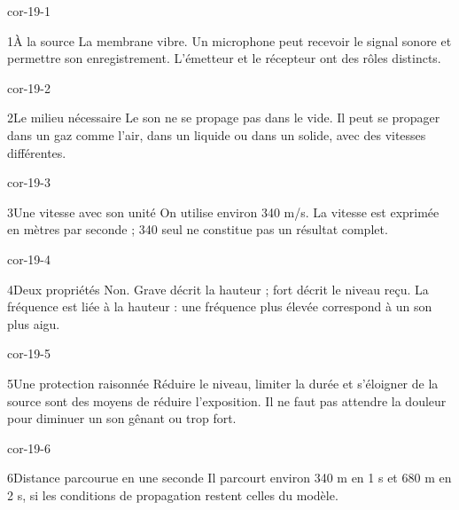 \documentclass[12pt,twoside,openany]{book}
\begin{document}
\clearpage{}
\begin{blocLivre}{cor-19-1}
\begin{corrige}{1}{À la source}
La membrane vibre. Un microphone peut recevoir le signal sonore et permettre son enregistrement. L’émetteur et le récepteur ont des rôles distincts.\par
\end{corrige}\end{blocLivre}
\begin{blocLivre}{cor-19-2}
\begin{corrige}{2}{Le milieu nécessaire}
Le son ne se propage pas dans le vide. Il peut se propager dans un gaz comme l’air, dans un liquide ou dans un solide, avec des vitesses différentes.\par
\end{corrige}\end{blocLivre}
\begin{blocLivre}{cor-19-3}
\begin{corrige}{3}{Une vitesse avec son unité}
On utilise environ 340 m/s. La vitesse est exprimée en mètres par seconde ; 340 seul ne constitue pas un résultat complet.\par
\end{corrige}\end{blocLivre}
\begin{blocLivre}{cor-19-4}
\begin{corrige}{4}{Deux propriétés}
Non. Grave décrit la hauteur ; fort décrit le niveau reçu. La fréquence est liée à la hauteur : une fréquence plus élevée correspond à un son plus aigu.\par
\end{corrige}\end{blocLivre}
\begin{blocLivre}{cor-19-5}
\begin{corrige}{5}{Une protection raisonnée}
Réduire le niveau, limiter la durée et s’éloigner de la source sont des moyens de réduire l’exposition. Il ne faut pas attendre la douleur pour diminuer un son gênant ou trop fort.\par
\end{corrige}\end{blocLivre}
\begin{blocLivre}{cor-19-6}
\begin{corrige}{6}{Distance parcourue en une seconde}
Il parcourt environ 340 m en 1 s et 680 m en 2 s, si les conditions de propagation restent celles du modèle.\par
\end{corrige}\end{blocLivre}
\end{document}
